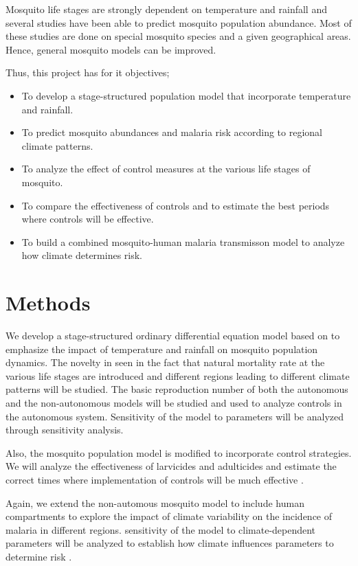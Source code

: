 \documentclass[12pt,a4paper,titlepage]{article}
\begin{document}
Mosquito life stages are strongly dependent on temperature and rainfall and several studies have been able to predict mosquito population abundance. Most of these studies are done on special mosquito species and a given geographical areas. Hence, general mosquito models can be improved. 

Thus, this project has for it objectives;

\begin{itemize}
\item To develop a stage-structured population model that incorporate temperature and rainfall.
\item To predict mosquito abundances and malaria risk according to regional climate patterns.
\item To analyze the effect of control measures at the various life stages of mosquito.
\item To compare the effectiveness of controls and to estimate the best periods where controls will be effective. 
\item To build a combined mosquito-human malaria transmisson model to analyze how climate determines risk.  
\end{itemize}


\section{Methods}
We develop a stage-structured ordinary differential equation model based on \cite{abdelrazec2017mathematical, hamdan2020effect, abiodun2016modelling, ewing2016modelling} to emphasize the impact of temperature and rainfall on mosquito population dynamics. The novelty in seen in the fact that natural mortality rate at the various life stages are introduced and different regions leading to different climate patterns will be studied. The basic reproduction number of both the autonomous and the non-autonomous models will be studied and used to analyze controls in the autonomous system. Sensitivity of the model to parameters will be analyzed through sensitivity analysis. 

Also, the mosquito population model is modified to incorporate control strategies. We will analyze the effectiveness of larvicides and adulticides and estimate the correct times where implementation of controls will be much effective \cite{Ocspp2016SuccessIM}.

Again, we extend the non-automous mosquito model to include human compartments to explore the impact of climate variability on the incidence of malaria in different regions. sensitivity of the model to climate-dependent parameters will be analyzed to establish how climate influences parameters to determine risk \cite{abiodun2016modelling}. 
\end{document}
